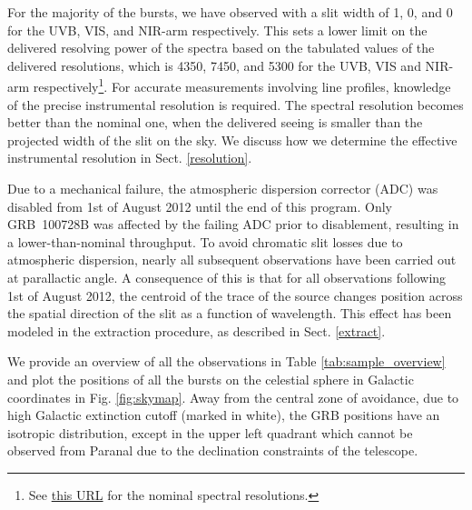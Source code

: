 \documentclass[longauth]{aa}    %
\begin{document}
For the majority of the bursts, we have observed with a slit width of 1,
0, and 0 for the UVB, VIS, and NIR-arm respectively. This sets a
lower limit on the delivered resolving power of the spectra based on the
tabulated values of the delivered resolutions, which is 4350, 7450, and 5300 for
the UVB, VIS and NIR-arm respectively\footnote{See
	\href{https://www.eso.org/sci/facilities/paranal/instruments/xshooter/inst.html}{this URL} for the nominal spectral resolutions.}. %
For accurate measurements involving line profiles, knowledge of the precise
instrumental resolution is required. The spectral resolution becomes better than
the nominal one, when the delivered seeing is smaller than the projected width
of the slit on the sky. We discuss how we determine the effective instrumental
resolution in Sect. \ref{resolution}.

Due to a mechanical failure, the atmospheric dispersion corrector (ADC) was
disabled from 1st of August 2012 until the end of this program. Only GRB~100728B
was affected by the failing ADC prior to disablement, resulting in a
lower-than-nominal throughput. To avoid chromatic slit losses due to atmospheric
dispersion, nearly all subsequent observations have been carried out at
parallactic angle. A consequence of this is that for all observations following
1st of August 2012, the centroid of the trace of the source changes position
across the spatial direction of the slit as a function of wavelength. This
effect has been modeled in the extraction procedure, as described in Sect.
\ref{extract}.



We provide an overview of all the observations in Table
\ref{tab:sample_overview} and plot the positions of all the bursts on the
celestial sphere in Galactic coordinates in Fig. \ref{fig:skymap}. Away from the
central zone of avoidance, due to high Galactic extinction cutoff (marked in
white), the GRB positions have an isotropic distribution, except in the upper
left quadrant which cannot be observed from Paranal due to the declination
constraints of the telescope.
\end{document}
